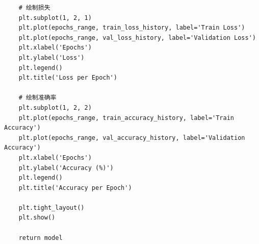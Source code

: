 \documentclass[a4paper,11pt,AutoFakeBold]{ctexart}
\begin{document}
\begin{lstlisting}
    # 绘制损失
    plt.subplot(1, 2, 1)
    plt.plot(epochs_range, train_loss_history, label='Train Loss')
    plt.plot(epochs_range, val_loss_history, label='Validation Loss')
    plt.xlabel('Epochs')
    plt.ylabel('Loss')
    plt.legend()
    plt.title('Loss per Epoch')
    
    # 绘制准确率
    plt.subplot(1, 2, 2)
    plt.plot(epochs_range, train_accuracy_history, label='Train Accuracy')
    plt.plot(epochs_range, val_accuracy_history, label='Validation Accuracy')
    plt.xlabel('Epochs')
    plt.ylabel('Accuracy (%)')
    plt.legend()
    plt.title('Accuracy per Epoch')
    
    plt.tight_layout()
    plt.show()
    
    return model
    
\end{lstlisting}
\end{document}
